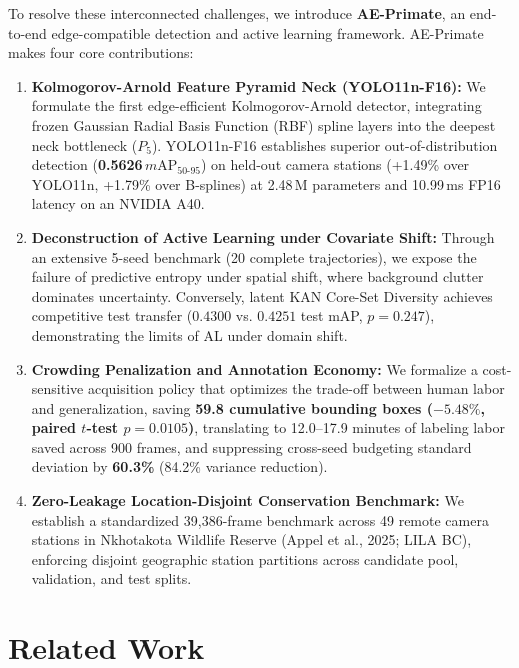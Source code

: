 \documentclass[conference]{IEEEtran}
\begin{document}
To resolve these interconnected challenges, we introduce \textbf{AE-Primate}, an end-to-end edge-compatible detection and active learning framework. AE-Primate makes four core contributions:
\begin{enumerate}
  \item \textbf{Kolmogorov-Arnold Feature Pyramid Neck (YOLO11n-F16):} We formulate the first edge-efficient Kolmogorov-Arnold detector, integrating frozen Gaussian Radial Basis Function (RBF) spline layers into the deepest neck bottleneck ($P_5$). YOLO11n-F16 establishes superior out-of-distribution detection (\textbf{0.5626\,$m\text{AP}_{50\text{-}95}$}) on held-out camera stations (+1.49\% over YOLO11n, +1.79\% over B-splines) at 2.48\,M parameters and 10.99\,ms FP16 latency on an NVIDIA A40.
  \item \textbf{Deconstruction of Active Learning under Covariate Shift:} Through an extensive 5-seed benchmark (20 complete trajectories), we expose the failure of predictive entropy under spatial shift, where background clutter dominates uncertainty. Conversely, latent KAN Core-Set Diversity achieves competitive test transfer ($0.4300$ vs. $0.4251$ test mAP, $p=0.247$), demonstrating the limits of AL under domain shift.
  \item \textbf{Crowding Penalization and Annotation Economy:} We formalize a cost-sensitive acquisition policy that optimizes the trade-off between human labor and generalization, saving \textbf{59.8 cumulative bounding boxes ($-5.48\%$, paired $t$-test $p=0.0105$)}, translating to 12.0--17.9 minutes of labeling labor saved across 900 frames, and suppressing cross-seed budgeting standard deviation by \textbf{60.3\%} (84.2\% variance reduction).
  \item \textbf{Zero-Leakage Location-Disjoint Conservation Benchmark:} We establish a standardized 39,386-frame benchmark across 49 remote camera stations in Nkhotakota Wildlife Reserve (Appel et al., 2025; LILA BC), enforcing disjoint geographic station partitions across candidate pool, validation, and test splits.
\end{enumerate}

\section{Related Work}
\end{document}
